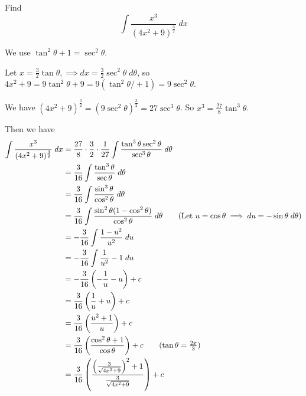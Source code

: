 \documentclass{article}
\begin{document}
\begin{example}
  Find \[
    \int \frac{x^3}{(4x^2 +9)^{\frac{3}{2}}} \; dx
  \]

  We use $\tan^2 \theta + 1 = \sec^2 \theta$.

  Let $x = \frac{3}{2} \tan \theta, \implies dx = \frac{3}{2}\sec^2 \theta \; d\theta$, so $4x^2 + 9 = 9\tan^2\theta + 9 = 9(\tan^2 \theta /+ 1) = 9\sec^2 \theta$.

  We have $(4x^2 + 9)^{\frac{3}{2}} = (9\sec^2\theta)^{\frac{3}{2}} = 27\sec^3\theta$. So $x^3 = \frac{27}{8} \tan^3 \theta$.

  Then we have
  \begin{align*}
    \int \frac{x^3}{(4x^2 +9)^{\frac{3}{2}}} \; dx &= \frac{27}{8}\cdot\frac{3}{2}\cdot\frac{1}{27} \int \frac{\tan^3\theta\sec^2\theta}{\sec^3\theta} \; d\theta\\
    &= \frac{3}{16}\int\frac{\tan^3\theta}{\sec \theta} \; d\theta\\
    &= \frac{3}{16}\int\frac{\sin^3\theta}{\cos^2 \theta} \; d\theta\\
    &= \frac{3}{16}\int\frac{\sin^2\theta(1-\cos^2\theta)}{\cos^2 \theta} \; d\theta \tag{Let $u = \cos \theta \implies du = -\sin \theta \; d\theta$}\\
    &= -\frac{3}{16}\int\frac{1-u^2}{u^2}\; du\\
    &= -\frac{3}{16}\int\frac{1}{u^2} - 1\; du\\
    &= -\frac{3}{16}\left(-\frac{1}{u} -u\right) + c\\
    &= \frac{3}{16}\left(\frac{1}{u} + u\right) + c\\
    &= \frac{3}{16}\left(\frac{u^2 + 1}{u} \right) + c\\
    &= \frac{3}{16}\left(\frac{\cos^2 \theta + 1}{\cos\theta} \right) + c \tag{$\tan \theta = \frac{2x}{3}$}\\
    &= \frac{3}{16} \left(\frac{\left(\frac{3}{\sqrt{4x^2 + 9}}\right)^2 + 1}{\frac{3}{\sqrt{4x^2 + 9}}}\right) + c\\
  \end{align*}
\end{example}
\end{document}
